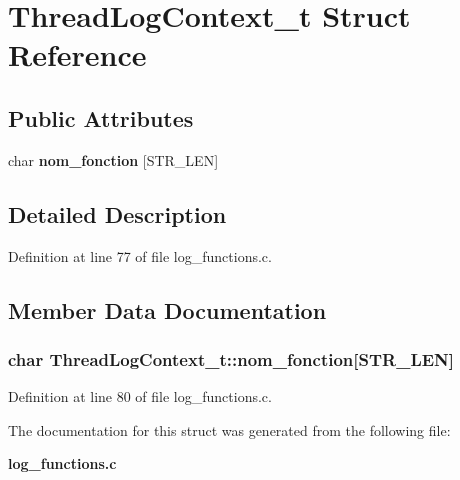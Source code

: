 \section{ThreadLogContext\_\-t Struct Reference}
\label{structThreadLogContext__t}
\subsection*{Public Attributes}
\begin{DoxyCompactItemize}
\item 
char {\bf nom\_\-fonction} [STR\_\-LEN]
\end{DoxyCompactItemize}


\subsection{Detailed Description}


Definition at line 77 of file log\_\-functions.c.

\subsection{Member Data Documentation}
\subsubsection[{nom\_\-fonction}]{\setlength{\rightskip}{0pt plus 5cm}char {\bf ThreadLogContext\_\-t::nom\_\-fonction}[STR\_\-LEN]}\label{structThreadLogContext__t_ae7157160ec953a6b2ea48744becb8978}


Definition at line 80 of file log\_\-functions.c.

The documentation for this struct was generated from the following file:\begin{DoxyCompactItemize}
\item 
{\bf log\_\-functions.c}\end{DoxyCompactItemize}
